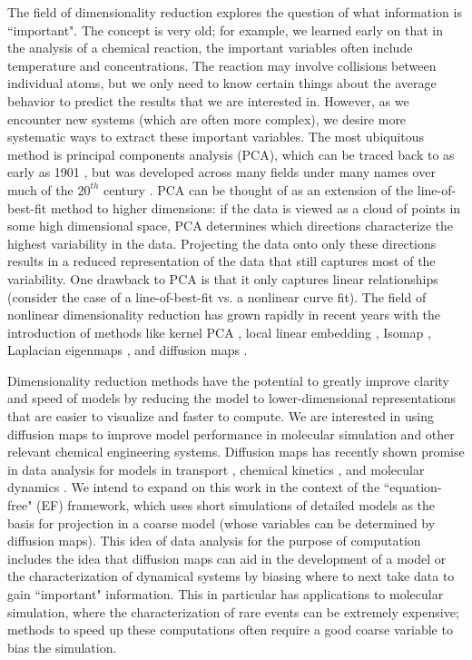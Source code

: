 \documentclass[12pt]{article}
\begin{document}
The field of dimensionality reduction explores the question of what information is ``important". The concept is very old; for example, we learned early on that in the analysis of a chemical reaction, the important variables often include temperature and concentrations. The reaction may involve collisions between individual atoms, but we only need to know certain things about the average behavior to predict the results that we are interested in. However, as we encounter new systems (which are often more complex), we desire more systematic ways to extract these important variables. The most ubiquitous method is principal components analysis (PCA), which can be traced back to as early as 1901 \cite{Pearson1901}, but was developed across many fields under many names over much of the $20^{th}$ century \cite{Hotelling1933, Sirovich1987}. PCA can be thought of as an extension of the line-of-best-fit method to higher dimensions: if the data is viewed as a cloud of points in some high dimensional space, PCA determines which directions characterize the highest variability in the data. Projecting the data onto only these directions results in a reduced representation of the data that still captures most of the variability. One drawback to PCA is that it only captures linear relationships (consider the case of a line-of-best-fit vs. a nonlinear curve fit). The field of nonlinear dimensionality reduction has grown rapidly in recent years with the introduction of methods like kernel PCA \cite{Scholkopf1998}, local linear embedding \cite{Roweis2000}, Isomap \cite{Tenenbaum2000}, Laplacian eigenmaps \cite{Belkin2003}, and diffusion maps \cite{Coifman2005, Coifman2005a, Coifman2006}. \vspace{1mm}

Dimensionality reduction methods have the potential to greatly improve clarity and speed of models by reducing the model to lower-dimensional representations that are easier to visualize and faster to compute. We are interested in using diffusion maps to improve model performance in molecular simulation and other relevant chemical engineering systems. Diffusion maps has recently shown promise in data analysis for models in transport \cite{Sonday2009}, chemical kinetics \cite{Chiavazzo2014}, and molecular dynamics \cite{Ferguson2010, Ferguson2011, Nedialkova2014, Kim2015}. We intend to expand on this work in the context of the ``equation-free" (EF) framework, which uses short simulations of detailed models as the basis for projection in a coarse model (whose variables can be determined by diffusion maps). This idea of data analysis for the purpose of computation includes the idea that diffusion maps can aid in the development of a model or the characterization of dynamical systems by biasing where to next take data to gain ``important" information. This in particular has applications to molecular simulation, where the characterization of rare events can be extremely expensive; methods to speed up these computations often require a good coarse variable to bias the simulation.  \vspace{1mm}
\end{document}
